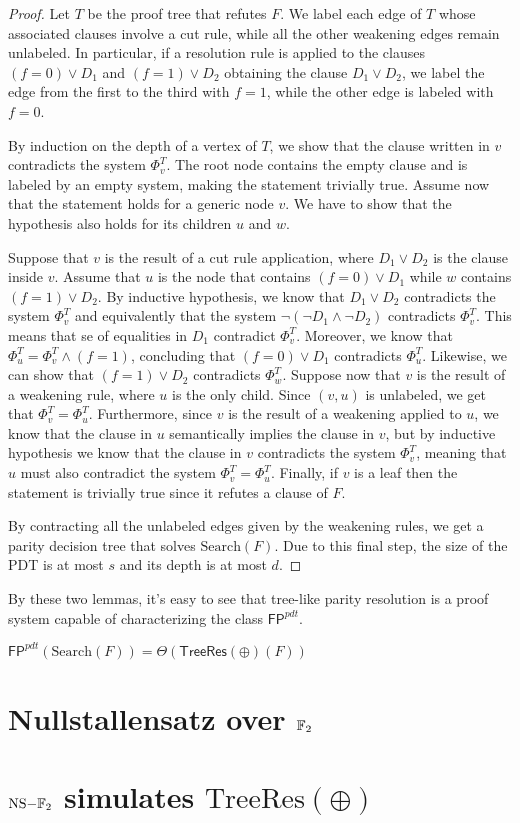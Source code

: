 \begin{proof}
    Let $T$ be the proof tree that refutes $F$. We label each edge of $T$ whose associated clauses involve a cut rule, while all the other weakening edges remain unlabeled. In particular, if a resolution rule is applied to the clauses $(f = 0) \lor D_1$ and $(f = 1) \lor D_2$ obtaining the clause $D_1 \lor D_2$, we label the edge from the first to the third with $f = 1$, while the other edge is labeled with $f = 0$.

    By induction on the depth of a vertex of $T$, we show that the clause written in $v$ contradicts the system $\Phi_v^T$. The root node contains the empty clause and is labeled by an empty system, making the statement trivially true. Assume now that the statement holds for a generic node $v$. We have to show that the hypothesis also holds for its children $u$ and $w$.

    Suppose that $v$ is the result of a cut rule application, where $D_1 \lor D_2$ is the clause inside $v$. Assume that $u$ is the node that contains $(f = 0) \lor D_1$ while $w$ contains $(f = 1) \lor D_2$. By inductive hypothesis, we know that $D_1 \lor D_2$ contradicts the system $\Phi_v^T$ and equivalently that the system $\lnot (\lnot D_1 \land \lnot D_2)$ contradicts $\Phi_v^T$. This means that se of equalities in $D_1$ contradict $\Phi_v^T$. Moreover, we know that $\Phi_u^T = \Phi_v^T \land (f = 1)$, concluding that $(f = 0) \lor D_1$ contradicts $\Phi_u^T$. Likewise, we can show that $(f = 1) \lor D_2$ contradicts $\Phi_w^T$. Suppose now that $v$ is the result of a weakening rule, where $u$ is the only child. Since $(v,u)$ is unlabeled, we get that $\Phi_v^T = \Phi_u^T$. Furthermore, since $v$ is the result of a weakening applied to $u$, we know that the clause in $u$ semantically implies the clause in $v$, but by inductive hypothesis we know that the clause in $v$ contradicts the system $\Phi_v^T$, meaning that $u$ must also contradict the system $\Phi_v^T = \Phi_u^T$. Finally, if $v$ is a leaf then the statement is trivially true since it refutes a clause of $F$.

    By contracting all the unlabeled edges given by the weakening rules, we get a parity decision tree that solves $\mathrm{Search}(F)$. Due to this final step, the size of the PDT is at most $s$ and its depth is at most $d$. 

\end{proof}

By these two lemmas, it's easy to see that tree-like parity resolution is a proof system capable of characterizing the class $\mathsf{FP}^{pdt}$.

\begin{corollary}
    $\mathsf{FP}^{pdt}(\mathrm{Search}(F)) = \Theta(\mathsf{TreeRes}(\oplus)(F))$
\end{corollary}


\section{Nullstallensatz over $\mathbb{F}_2$}

\section{$\mathrm{NS-}\mathbb{F}_2$ simulates $\mathrm{TreeRes}(\oplus)$}

\cleardoublepage